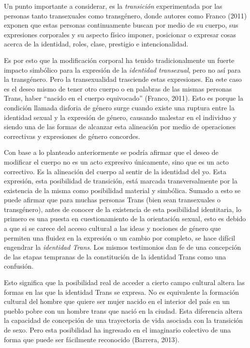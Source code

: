 Un punto importante a considerar, es la \emph{transición} experimentada por las
personas tanto transexuales como transgénero, donde autores como Franco (2011)
exponen que estas personas continuamente buscan por medio de su cuerpo, sus
expresiones corporales y su aspecto físico imponer, posicionar o expresar cosas
acerca de la identidad, roles, clase, prestigio e intencionalidad.

Es por esto que la modificación corporal ha tenido tradicionalmente un fuerte
impacto simbólico para la expresión de la \emph{identidad transexual}, pero no así para la transgénero.
Pero la transexualidad trasciende estas expresiones.
En este caso es el deseo mismo de tener otro cuerpo o en palabras de las mismas
personas Trans, haber “nacido en el cuerpo equivocado” (Franco, 2011).
Esto es porque la condición llamada disforia de género surge cuando existe una
ruptura entre la identidad sexual y la expresión de género, causando malestar en
el individuo y siendo una de las formas de alcanzar esta alineación por medio de
operaciones correctivas y expresiones de género concordes.

Con base a lo planteado anteriormente se podría afirmar que el deseo de
modificar el cuerpo no es un acto expresivo únicamente, sino que es un acto
correctivo.
Es la alineación del cuerpo al sentir de la identidad del yo.
Esta expresión, esta posibilidad de transición, está marcada transversalmente
por la existencia de la misma como posibilidad material y simbólica.
Sumado a esto se puede afirmar que para muchas personas Trans (bien sean
transexuales o transgénero), antes de conocer de la existencia de esta
posibilidad identitaria, lo primero es una puesta en cuestionamiento de la
orientación sexual, esto es debido a que si se carece del acceso cultural a las
ideas y nociones de género que permiten una fluidez en la expresión o un cambio
por completo, se hace difícil engendrar la \emph{identidad Trans}.
Los mismos testimonios dan fe de una concepción de las etapas tempranas de la
constitución de la identidad Trans como una confusión.

Esto significa que la posibilidad real de acceder a cierto campo cultural altera
las formas en las que la identidad Trans se expresa.
No es equivalente la formación cultural del hombre que quiere ser mujer nacido
en el interior del país en un pueblo pobre con un hombre trans que nació en la ciudad.
Esta diferencia altera la capacidad de concepción de una trayectoria de vida
asociada con la transición de sexo.
Pero esta posibilidad ha ingresado en el imaginario colectivo de una forma que
puede ser fácilmente reconocido (Barrera, 2013).

